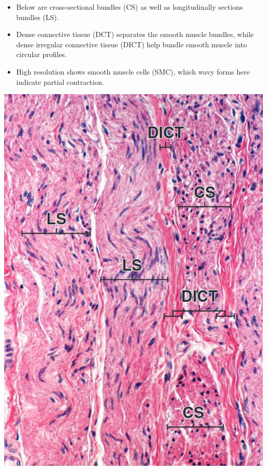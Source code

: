 \begin{itemize}
\begin{itemize}
      \item Below are cross-sectional bundles (CS) as well as longitudinally sections bundles (LS). 
      \item Dense connective tissue (DCT) separates the smooth muscle bundles, while dense irregular connective tissue (DICT) help bundle smooth muscle into circular profiles.
      \item High resolution shows smooth muscle cells (SMC), which wavy forms here indicate partial contraction.
    \end{itemize}
  \begin{center}
    \includegraphics[scale=0.25]{images/week-1-rp11.png} 

\end{center}
\end{itemize}
